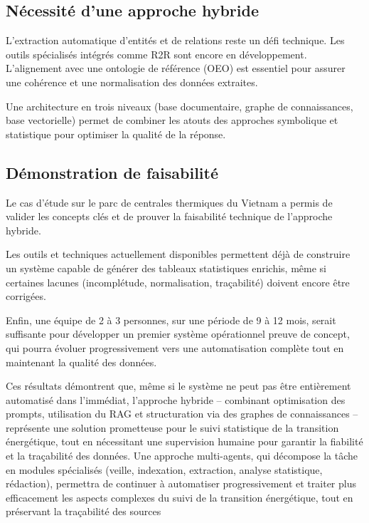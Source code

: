 \documentclass[a4paper,11pt]{report}
\begin{document}
\subsection{Nécessité d'une approche hybride}\label{nuxe9cessituxe9-dune-approche-hybride}

L'extraction automatique d'entités et de relations reste un défi technique. Les outils spécialisés intégrés comme R2R sont encore en développement. L'alignement avec une ontologie de référence (OEO) est essentiel pour assurer une cohérence et une normalisation des données extraites.

Une architecture en trois niveaux (base documentaire, graphe de connaissances, base vectorielle) permet de combiner les atouts des approches symbolique et statistique pour optimiser la qualité de la réponse.

\subsection{Démonstration de faisabilité}\label{duxe9monstration-de-faisabilituxe9}

Le cas d'étude sur le parc de centrales thermiques du Vietnam a permis de valider les concepts clés et de prouver la faisabilité technique de l'approche hybride.

Les outils et techniques actuellement disponibles permettent déjà de construire un système capable de générer des tableaux statistiques enrichis, même si certaines lacunes (incomplétude, normalisation, traçabilité) doivent encore être corrigées.

Enfin, une équipe de 2 à 3 personnes, sur une période de 9 à 12 mois, serait suffisante pour développer un premier système opérationnel preuve de concept, qui pourra évoluer progressivement vers une automatisation complète tout en maintenant la qualité des données.

Ces résultats démontrent que, même si le système ne peut pas être entièrement automatisé dans l'immédiat, l'approche hybride -- combinant optimisation des prompts, utilisation du RAG et structuration via des graphes de connaissances -- représente une solution prometteuse pour le suivi statistique de la transition énergétique, tout en nécessitant une supervision humaine pour garantir la fiabilité et la traçabilité des données. Une approche multi-agents, qui décompose la tâche en modules spécialisés (veille, indexation, extraction, analyse statistique, rédaction), permettra de continuer à automatiser progressivement et traiter plus efficacement les aspects complexes du suivi de la transition énergétique, tout en préservant la traçabilité des sources
\end{document}
